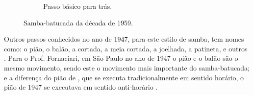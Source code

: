 \begin{itemize}
\begin{figure}[h]
\begin{subfigure}[b]{0.7\textwidth}
        \caption{Passo básico para trás.}
        \label{fig:samba-batucada-basico-tras}
    \end{subfigure}
    \caption{Samba-batucada da década de 1959.}\label{fig:samba-batucada-basico}
\end{figure}

Outros passos conhecidos no ano de 1947, para este estilo de samba, tem nomes como: 
o pião, o balão, a cortada, a meia cortada, a joelhada, a patineta, e outros \cite[pp. 66]{fornaciari1947aprender}.
Para o Prof. Fornaciari, em São Paulo no ano de 1947 o pião e o balão são o mesmo movimento, 
sendo este o movimento mais importante do samba-batucada;
e a diferença do pião de \AnoLivro, que se executa tradicionalmente em sentido horário,
o pião de 1947 se executava em sentido anti-horário \cite[pp. 68,72]{fornaciari1947aprender} 
\cite[pp. 73]{fornaciari1950aprender}.


\end{itemize}
